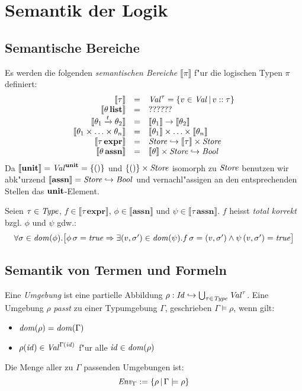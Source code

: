 \documentclass[12pt,a4paper,bigheadings]{scrartcl}
\newcommand{\semantic}[1]{\ensuremath{\llbracket#1\rrbracket}}
\newcommand{\assn}{\ensuremath{\mathbf{assn}}}
\newcommand{\atype}[1]{#1\,\assn}
\newcommand{\bexpr}{\ensuremath{\mathbf{expr}}}
\newcommand{\etype}[1]{#1\,\bexpr}
\newcommand{\tto}{\ensuremath{\xrightarrow{t}}}
\begin{document}
\section{Semantik der Logik}

\subsection{Semantische Bereiche}

Es werden die folgenden {\em semantischen Bereiche} $\semantic{\pi}$ f"ur die logischen Typen $\pi$
definiert:
\[\begin{array}{rcl}
  \semantic{\tau} & = & \Val^\tau = \{v\in\Val\,|\,\tj{v}{\tau}\} \\
  \semantic{\ltype{\theta}} & = & ?????? \\
  \semantic{\theta_1 \tto \theta_2} & = & \semantic{\theta_1} \to \semantic{\theta_2} \\
  \semantic{\theta_1\times\ldots\times\theta_n}&=&\semantic{\theta_1}\times\ldots\times\semantic{\theta_n} \\
  \semantic{\etype{\tau}} & = & \Store \pto \semantic{\tau} \times \Store \\
  \semantic{\atype{\theta}} & = & \semantic{\theta} \times \Store \pto \Bool
\end{array}\]
Da $\semantic{\unit} = \Val^\unit = \{()\}$ und $\{()\}\times{\text{\it Store\/}}$ isomorph zu
${\text{\it Store\/}}$ benutzen wir abk"urzend $\semantic{\assn}=\Store\pto\Bool$ und vernachl"assigen
an den entsprechenden Stellen das $\textbf{unit}$-Element.

\begin{definition}
  Seien $\tau\in{\text{\it Type\/}}$, $f\in\semantic{\etype{\tau}}$, $\phi\in\semantic{\assn}$ und
  $\psi\in\semantic{\atype{\tau}}$. $f$ heisst {\em total korrekt} bzgl. $\phi$ und
  $\psi$ gdw.:
  \[\begin{array}{l}
    \forall \sigma\in{\text{\it dom\/}}(\phi).
    \bigl[
      \phi\,\sigma = {\text{\it true\/}} 
      \Rightarrow \exists(v,\sigma')\in{\text{\it dom\/}}(\psi).f\,\sigma = (v,\sigma')\wedge \psi\,(v,\sigma')={\text{\it true\/}}
    \bigr]
  \end{array}\]
\end{definition}

\subsection{Semantik von Termen und Formeln}

Eine {\em Umgebung} ist eine partielle Abbildung $\rho:{\text{\it Id\/}}\hookrightarrow\bigcup_{\tau\in{\text{\it Type\/}}} {\text{\it Val\/}}^\tau$.
Eine Umgebung $\rho$ {\em passt} zu einer Typumgebung $\Gamma$, geschrieben $\Gamma \models \rho$,
wenn gilt:
\begin{itemize}
  \item ${\text{\it dom\/}}(\rho) = {\text{\it dom\/}}(\Gamma)$
  \item $\rho({\text{\it id\/}}) \in {\text{\it Val\/}}^{\Gamma({\text{\it id\/}})}$ f"ur alle ${\text{\it id\/}}\in{\text{\it dom\/}}(\rho)$
\end{itemize}
Die Menge aller zu $\Gamma$ passenden Umgebungen ist:
\[
  {\text{\it Env\/}}_\Gamma := \{\rho\,|\,\Gamma \models \rho\}
\]
\end{document}
